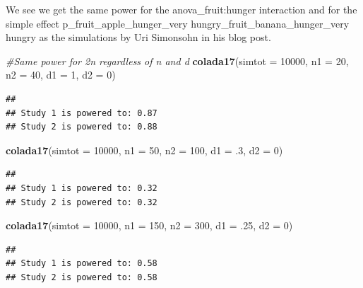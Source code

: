 \documentclass[]{book}
\newenvironment{Shaded}{\begin{snugshade}}{\end{snugshade}}
\newcommand{\CommentTok}[1]{\textcolor[rgb]{0.56,0.35,0.01}{\textit{#1}}}
\newcommand{\DataTypeTok}[1]{\textcolor[rgb]{0.13,0.29,0.53}{#1}}
\newcommand{\DecValTok}[1]{\textcolor[rgb]{0.00,0.00,0.81}{#1}}
\newcommand{\FloatTok}[1]{\textcolor[rgb]{0.00,0.00,0.81}{#1}}
\newcommand{\KeywordTok}[1]{\textcolor[rgb]{0.13,0.29,0.53}{\textbf{#1}}}
\newcommand{\NormalTok}[1]{#1}
\begin{document}
We see we get the same power for the anova\_fruit:hunger interaction and for the simple effect p\_fruit\_apple\_hunger\_very hungry\_fruit\_banana\_hunger\_very hungry as the simulations by Uri Simonsohn in his blog post.

\begin{Shaded}
\begin{Highlighting}[]
\CommentTok{#Same power for 2n regardless of n and d}
\KeywordTok{colada17}\NormalTok{(}\DataTypeTok{simtot =} \DecValTok{10000}\NormalTok{, }\DataTypeTok{n1 =} \DecValTok{20}\NormalTok{, }\DataTypeTok{n2 =} \DecValTok{40}\NormalTok{, }\DataTypeTok{d1 =} \DecValTok{1}\NormalTok{, }\DataTypeTok{d2 =} \DecValTok{0}\NormalTok{)  }
\end{Highlighting}
\end{Shaded}

\begin{verbatim}
## 
## Study 1 is powered to: 0.87
## Study 2 is powered to: 0.88
\end{verbatim}

\begin{Shaded}
\begin{Highlighting}[]
\KeywordTok{colada17}\NormalTok{(}\DataTypeTok{simtot =} \DecValTok{10000}\NormalTok{, }\DataTypeTok{n1 =} \DecValTok{50}\NormalTok{, }\DataTypeTok{n2 =} \DecValTok{100}\NormalTok{, }\DataTypeTok{d1 =} \FloatTok{.3}\NormalTok{, }\DataTypeTok{d2 =} \DecValTok{0}\NormalTok{)}
\end{Highlighting}
\end{Shaded}

\begin{verbatim}
## 
## Study 1 is powered to: 0.32
## Study 2 is powered to: 0.32
\end{verbatim}

\begin{Shaded}
\begin{Highlighting}[]
\KeywordTok{colada17}\NormalTok{(}\DataTypeTok{simtot =} \DecValTok{10000}\NormalTok{, }\DataTypeTok{n1 =} \DecValTok{150}\NormalTok{, }\DataTypeTok{n2 =} \DecValTok{300}\NormalTok{, }\DataTypeTok{d1 =} \FloatTok{.25}\NormalTok{, }\DataTypeTok{d2 =} \DecValTok{0}\NormalTok{)}
\end{Highlighting}
\end{Shaded}

\begin{verbatim}
## 
## Study 1 is powered to: 0.58
## Study 2 is powered to: 0.58
\end{verbatim}
\end{document}
